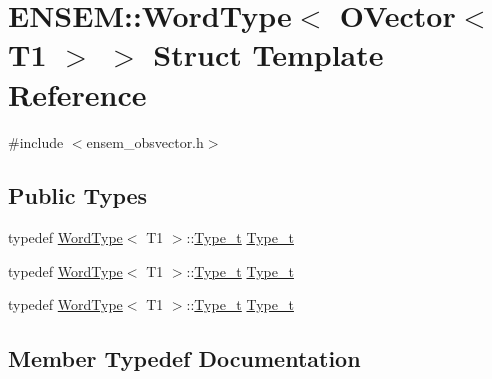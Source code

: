 \hypertarget{structENSEM_1_1WordType_3_01OVector_3_01T1_01_4_01_4}{}\section{E\+N\+S\+EM\+:\+:Word\+Type$<$ O\+Vector$<$ T1 $>$ $>$ Struct Template Reference}
\label{structENSEM_1_1WordType_3_01OVector_3_01T1_01_4_01_4}


{\ttfamily \#include $<$ensem\+\_\+obsvector.\+h$>$}

\subsection*{Public Types}
\begin{DoxyCompactItemize}
\item 
typedef \mbox{\hyperlink{structENSEM_1_1WordType}{Word\+Type}}$<$ T1 $>$\+::\mbox{\hyperlink{structENSEM_1_1WordType_3_01OVector_3_01T1_01_4_01_4_ab09c111517a85cf22c58611d96219000}{Type\+\_\+t}} \mbox{\hyperlink{structENSEM_1_1WordType_3_01OVector_3_01T1_01_4_01_4_ab09c111517a85cf22c58611d96219000}{Type\+\_\+t}}
\item 
typedef \mbox{\hyperlink{structENSEM_1_1WordType}{Word\+Type}}$<$ T1 $>$\+::\mbox{\hyperlink{structENSEM_1_1WordType_3_01OVector_3_01T1_01_4_01_4_ab09c111517a85cf22c58611d96219000}{Type\+\_\+t}} \mbox{\hyperlink{structENSEM_1_1WordType_3_01OVector_3_01T1_01_4_01_4_ab09c111517a85cf22c58611d96219000}{Type\+\_\+t}}
\item 
typedef \mbox{\hyperlink{structENSEM_1_1WordType}{Word\+Type}}$<$ T1 $>$\+::\mbox{\hyperlink{structENSEM_1_1WordType_3_01OVector_3_01T1_01_4_01_4_ab09c111517a85cf22c58611d96219000}{Type\+\_\+t}} \mbox{\hyperlink{structENSEM_1_1WordType_3_01OVector_3_01T1_01_4_01_4_ab09c111517a85cf22c58611d96219000}{Type\+\_\+t}}
\end{DoxyCompactItemize}


\subsection{Member Typedef Documentation}
\mbox{\label{structENSEM_1_1WordType_3_01OVector_3_01T1_01_4_01_4_ab09c111517a85cf22c58611d96219000}} 
